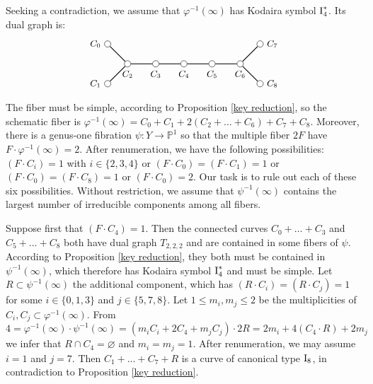 \documentclass[oneside, 12pt]{amsart}
\theoremstyle{definition}
\theoremstyle{remark}
\newcommand{\PP}{\mathbb{P}}
\newcommand{\I}{\text{\rm I}}
\newcommand{\ra}{\rightarrow}
\begin{document}
\proof
Seeking a contradiction, we assume that $\varphi^{-1}(\infty)$ has Kodaira symbol $\I_4^*$. Its dual graph is:
\begin{equation*}
\begin{gathered}
\begin{tikzpicture}
[node distance=1cm, font=\small]
\tikzstyle{vertex}=[circle, draw, fill=white, inner sep=0mm, minimum size=1.5ex]
\node[vertex]	(C2)  	at (1,0) 	[label=below:{$C_2$}] 		{};
\node[vertex]	(C3)			[right of=C2, label=below:{$C_3$}]	{};
\node[vertex]	(C4)			[right of=C3, label=below:{$C_4$}]	{};
\node[vertex]	(C5)			[right of=C4, label=below:{$C_5$}]	{};
\node[vertex]	(C6)			[right of=C5, label=below:{$C_6$}]	{};

\node[vertex]	(C7)			[above right of=C6, label=right:{$C_7$}]	{};
\node[vertex]	(C8)			[below right of=C6, label=right:{$C_8$}]	{};
\node[vertex]	(C0)			[above left  of=C2, label=left :{$C_0$}]	{};
\node[vertex]	(C1)			[below left  of=C2, label=left :{$C_1$}]	{};

\draw [thick] (C2)--(C3)--(C4)--(C5)--(C6);
\draw [thick] (C0)--(C2)--(C1);
\draw [thick] (C7)--(C6)--(C8);
\end{tikzpicture}
\end{gathered}
\end{equation*}
The fiber must be simple, according to   Proposition \ref{key reduction}, 
so the schematic fiber is  $\varphi^{-1}(\infty) = C_0+C_1+2(C_2+\ldots+C_6)+C_7+C_8$.
Moreover,  there is a genus-one fibration $\psi:Y\ra\PP^1$ so that the multiple fiber $2F$ have  $F\cdot\varphi^{-1}(\infty)=2$.
After renumeration, we have the following   possibilities: $(F\cdot C_i)=1$ with $i\in\{2,3,4\}$
or $(F\cdot C_0)=(F\cdot C_1)=1$ or $(F\cdot C_0)=(F\cdot C_8)=1$ or $(F\cdot C_0)=2$.
Our task is to rule out each of these six possibilities. 
Without restriction, we assume that   $\psi^{-1}(\infty)$ contains the largest number of irreducible components
among all fibers.

Suppose first that $(F\cdot C_4)=1$. Then the connected curves $C_0+\ldots+C_3$ and $C_5+\ldots+C_8$ both have
dual graph $T_{2,2,2}$ and are contained in some fibers of $\psi$. According to Proposition \ref{key reduction}, 
they both must be contained in  
$\psi^{-1}(\infty)$, which therefore has  Kodaira symbol $\I_4^*$ and must be simple.
Let $R\subset \psi^{-1}(\infty)$ the additional component, which has $(R\cdot C_i)=(R\cdot C_j)=1$ for some
$i\in\{0,1,3\}$ and $j\in\{5,7,8\}$. Let $1\leq m_i,m_j\leq 2$ be the multiplicities of $C_i,C_j\subset\varphi^{-1}(\infty)$.
From
$$
4=\varphi^{-1}(\infty)\cdot\psi^{-1}(\infty) = (m_iC_i+2C_4+m_jC_j)\cdot 2R = 2m_i+4(C_4\cdot R) + 2m_j 
$$
we infer that $R\cap C_4=\varnothing$ and $m_i=m_j=1$. After renumeration,
we may assume $i=1$ and $j=7$. Then $C_1+\ldots+C_7+R$ is a curve
of canonical type $\I_8$, in contradiction to Proposition \ref{key reduction}.
\end{document}
